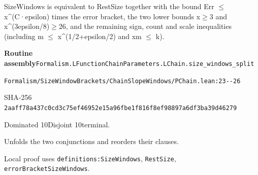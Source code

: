 
\begin{formalstatement}[D566]\label{decomp:D566}
SizeWindows is equivalent to RestSize together with the bound Err \ensuremath{\le} x\textasciicircum{}(C·epsilon) times the error bracket, the two lower bounds x\ensuremath{\ge}3 and x\textasciicircum{}(3epsilon/8)\ensuremath{\ge}26, and the remaining sign, count and scale inequalities (including m \ensuremath{\le} x\textasciicircum{}(1/2+epsilon/2) and xm \ensuremath{\le} k).
\end{formalstatement}
{\small\raggedright\noindent\textsf{\bfseries Routine assembly}\quad \nolinkurl{Formalism.LFunctionChainParameters.LChain.size_windows_split}\par\noindent \nolinkurl{Formalism/SizeWindowBrackets/ChainSlopeWindows/PChain.lean:23--26}\par\noindent SHA-256 \nolinkurl{2aaff78a437c0cd3c75ef46952e15a96fbe1f816f8ef98897a6df3ba39d46279}\par\noindent Dominated 10\quad Disjoint 10\quad terminal.\par}
Unfolds the two conjunctions and reorders their clauses.
{\small\raggedright Local proof uses \nolinkurl{definitions:SizeWindows}, \nolinkurl{RestSize}, \nolinkurl{errorBracketSizeWindows}.\par}
